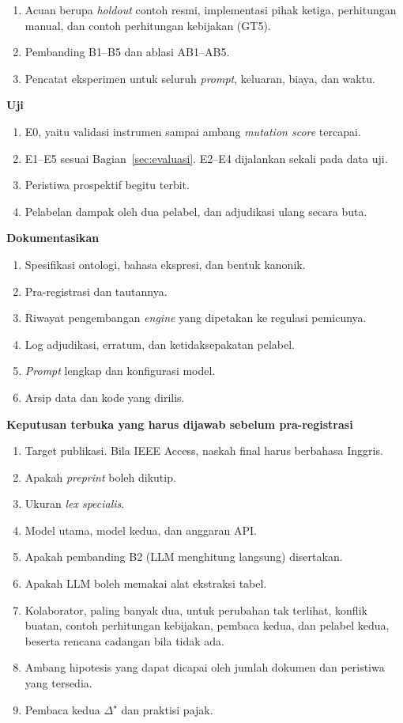 \documentclass[journal,a4paper]{IEEEtran}
\newcommand{\en}[1]{\textit{#1}}
\newcommand{\emas}{\star}
\newif\ifrancangan \rancangantrue
\newcommand{\kotak}[3]{\ifrancangan\par\begingroup\scriptsize
  \def\FrameCommand{\fboxsep=3pt\fboxrule=0.4pt\fcolorbox{#1!60!black}{#1!6}}%
  \MakeFramed{\advance\hsize-\width\FrameRestore}\noindent\textbf{#2}\par #3\endMakeFramed\endgroup\fi}
\begin{document}
{\begin{enumerate}[leftmargin=*,nosep]
  \item Acuan berupa \en{holdout} contoh resmi, implementasi pihak ketiga, perhitungan manual, dan contoh perhitungan kebijakan (GT5).
  \item Pembanding B1--B5 dan ablasi AB1--AB5.
  \item Pencatat eksperimen untuk seluruh \en{prompt}, keluaran, biaya, dan waktu.
\end{enumerate}
\textbf{Uji}
\begin{enumerate}[leftmargin=*,nosep]
  \item E0, yaitu validasi instrumen sampai ambang \en{mutation score} tercapai.
  \item E1--E5 sesuai Bagian~\ref{sec:evaluasi}. E2--E4 dijalankan sekali pada data uji.
  \item Peristiwa prospektif begitu terbit.
  \item Pelabelan dampak oleh dua pelabel, dan adjudikasi ulang secara buta.
\end{enumerate}
\textbf{Dokumentasikan}
\begin{enumerate}[leftmargin=*,nosep]
  \item Spesifikasi ontologi, bahasa ekspresi, dan bentuk kanonik.
  \item Pra-registrasi dan tautannya.
  \item Riwayat pengembangan \en{engine} yang dipetakan ke regulasi pemicunya.
  \item Log adjudikasi, erratum, dan ketidaksepakatan pelabel.
  \item \en{Prompt} lengkap dan konfigurasi model.
  \item Arsip data dan kode yang dirilis.
\end{enumerate}
}
\kotak{orange}{Keputusan terbuka yang harus dijawab sebelum pra-registrasi}{
\begin{enumerate}[leftmargin=*,nosep]
  \item Target publikasi. Bila IEEE Access, naskah final harus berbahasa Inggris.
  \item Apakah \en{preprint} boleh dikutip.
  \item Ukuran \en{lex specialis}.
  \item Model utama, model kedua, dan anggaran API.
  \item Apakah pembanding B2 (LLM menghitung langsung) disertakan.
  \item Apakah LLM boleh memakai alat ekstraksi tabel.
  \item Kolaborator, paling banyak dua, untuk perubahan tak terlihat, konflik buatan, contoh perhitungan kebijakan, pembaca kedua, dan pelabel kedua, beserta rencana cadangan bila tidak ada.
  \item Ambang hipotesis yang dapat dicapai oleh jumlah dokumen dan peristiwa yang tersedia.
  \item Pembaca kedua $\Delta^{\emas}$ dan praktisi pajak.
\end{enumerate}
}
\fi



\end{document}

